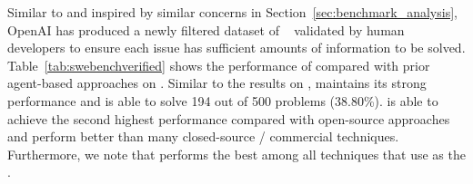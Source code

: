 Similar to \swebenchlitefiltered{} and inspired by similar concerns in Section~\ref{sec:benchmark_analysis}, OpenAI has produced a newly filtered dataset of \swebenchverified~\cite{openaiverified} validated by human developers to ensure each issue has sufficient amounts of information to be solved. 
Table~\ref{tab:swebenchverified} shows the performance of \tech compared with prior agent-based approaches on \swebenchverified. 
Similar to the results on \swebenchlite, \tech maintains its strong performance and is able to solve 194 out of 500 problems (38.80\%). 
\tech is able to achieve the second highest performance compared with open-source approaches and perform better than many closed-source / commercial techniques. 
Furthermore, we note that \tech performs the best among all techniques that use \gptfouro as the \llm. 

